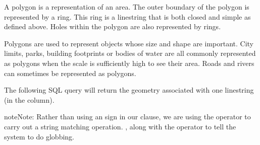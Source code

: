\documentclass[a4paper,11pt,english]{sphinxmanual}
\begin{document}
A polygon is a representation of an area.  The outer boundary of the polygon is represented by a ring.  This ring is a linestring that is both closed and simple as defined above.  Holes within the polygon are also represented by rings.

Polygons are used to represent objects whose size and shape are important.  City limits, parks, building footprints or bodies of water are all commonly represented as polygons when the scale is sufficiently high to see their area.  Roads and rivers can sometimes be represented as polygons.

The following SQL query will return the geometry associated with one linestring (in the  column).

\begin{sphinxVerbatim}[commandchars=\\\{\}]
 
   
     
\end{sphinxVerbatim}

\begin{sphinxadmonition}{note}{Note:}
Rather than using an \sphinxcode{\sphinxupquote{=}} sign in our  clause, we are using the  operator to carry out a string matching operation. , along with the  operator to tell the system to do globbing.
\end{sphinxadmonition}

\begin{sphinxVerbatim}[commandchars=\\\{\}]
         
                  
\end{sphinxVerbatim}
\end{document}
